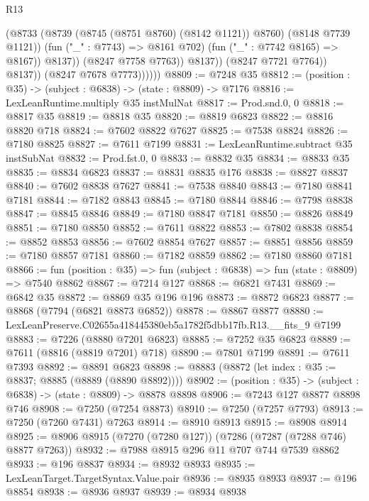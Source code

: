 \begin{lexlean}{R13}
\begin{coremodule}
                                (@8733
                                  (@8739 (@8745 (@8751 @8760) (@8142 @1121)) @8760)
                                  (@8148 @7739 @1121))
                                (fun ("_" : @7743) => @8161 @702)
                                (fun ("_" : @7742 @8165) => @8167))
                              @8137))
                          (@8247 @7758 @7763))
                        @8137))
                    (@8247 @7721 @7764))
                  @8137))
              (@8247 @7678 @7773))))))
@8809 := @7248 @35
@8812 := (position : @35) -> (subject : @6838) -> (state : @8809) -> @7176
@8816 := LexLeanRuntime.multiply @35 instMulNat
@8817 := Prod.snd.{0, 0}
@8818 := @8817 @35
@8819 := @8818 @35
@8820 := @8819 @6823
@8822 := @8816 @8820 @718
@8824 := @7602 @8822 @7627
@8825 := @7538 @8824
@8826 := @7180 @8825
@8827 := @7611 @7199
@8831 := LexLeanRuntime.subtract @35 instSubNat
@8832 := Prod.fst.{0, 0}
@8833 := @8832 @35
@8834 := @8833 @35
@8835 := @8834 @6823
@8837 := @8831 @8835 @176
@8838 := @8827 @8837
@8840 := @7602 @8838 @7627
@8841 := @7538 @8840
@8843 := @7180 @8841 @7181
@8844 := @7182 @8843
@8845 := @7180 @8844
@8846 := @7798 @8838
@8847 := @8845 @8846
@8849 := @7180 @8847 @7181
@8850 := @8826 @8849
@8851 := @7180 @8850
@8852 := @7611 @8822
@8853 := @7802 @8838
@8854 := @8852 @8853
@8856 := @7602 @8854 @7627
@8857 := @8851 @8856
@8859 := @7180 @8857 @7181
@8860 := @7182 @8859
@8862 := @7180 @8860 @7181
@8866 := fun (position : @35) => fun (subject : @6838) => fun (state : @8809) => @7540 @8862
@8867 := @7214 @127
@8868 := @6821 @7431
@8869 := @6842 @35
@8872 := @8869 @35 @196 @196
@8873 := @8872 @6823
@8877 := @8868 (@7794 (@6821 @8873 @6852))
@8878 := @8867 @8877
@8880 := LexLeanPreserve.C02655a418445380eb5a1782f5dbb17fb.R13.__fits_9 @7199
@8883 := @7226 (@8880 @7201 @6823)
@8885 := @7252 @35 @6823
@8889 := @7611 (@8816 (@8819 @7201) @718)
@8890 := @7801 @7199
@8891 := @7611 @7393
@8892 := @8891 @6823
@8898 := @8883 (@8872 (let index : @35 := @8837; @8885 (@8889 (@8890 @8892))))
@8902 := (position : @35) -> (subject : @6838) -> (state : @8809) -> @8878 @8898
@8906 := @7243 @127 @8877 @8898 @746
@8908 := @7250 (@7254 @8873)
@8910 := @7250 (@7257 @7793)
@8913 := @7250 (@7260 @7431) @7263
@8914 := @8910 @8913
@8915 := @8908 @8914
@8925 := @8906 @8915 (@7270 (@7280 @127)) (@7286 (@7287 (@7288 @746) @8877 @7263))
@8932 := @7988 @8915 @296 @11 @707 @744 @7539 @8862
@8933 := @196 @8837
@8934 := @8932 @8933
@8935 := LexLeanTarget.TargetSyntax.Value.pair
@8936 := @8935 @8933
@8937 := @196 @8854
@8938 := @8936 @8937
@8939 := @8934 @8938

\end{coremodule}
\end{lexlean}
